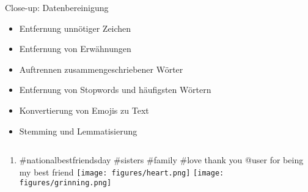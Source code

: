 \documentclass[aspectratio=169]{beamer} %
\begin{document}
\begin{frame}{Close-up: Datenbereinigung}
    \begin{itemize}[label=\textbullet]
        \item \textcolor{myred}{Entfernung unnötiger Zeichen}  
        \item \textcolor{myblue}{Entfernung von Erwähnungen}
        \item \textcolor{myorange}{Auftrennen zusammengeschriebener Wörter}
        \item \textcolor{mygreen}{Entfernung von Stopwords und häufigsten Wörtern}
        \item \textcolor{mypurple}{Konvertierung von Emojis zu Text}
        \item \textcolor{mybrown}{Stemming und Lemmatisierung}
    \end{itemize}

     \begin{columns}[T] %
        \begin{column}{0.5\textwidth}
            \begin{enumerate}[label=\arabic*.] 
                \item \textcolor{myred}{\#}\textcolor{myorange}{national}\textcolor{mybrown}{best}\textcolor{myorange}{friend}\textcolor{mybrown}{s}\textcolor{myorange}{day}
                \textcolor{myred}{\#}\textcolor{mybrown}{sisters}
                \textcolor{myred}{\#}family 
                \textcolor{myred}{\#}love thank 
                \textcolor{mygreen}{you}
                \textcolor{myblue}{@user} 
                \textcolor{mygreen}{for being my} 
                \textcolor{mybrown}{best} friend 
                \colorbox{mypurple}{\texttt{[image: figures/heart.png]}} 
                \colorbox{mypurple}{\texttt{[image: figures/grinning.png]}} 


\end{enumerate}
\end{column}
\end{columns}
\end{frame}
\end{document}
